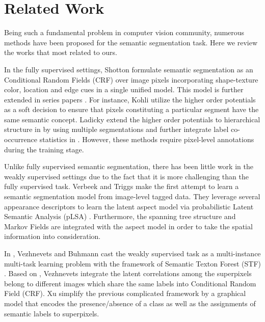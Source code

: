 \section{Related Work}
Being such a fundamental problem in computer vision community, numerous methods have been proposed for the semantic segmentation task. Here we review the works that most related to ours.

In the fully supervised settings, Shotton \etal \cite{shotton2006textonboost} formulate semantic segmentation as an Conditional Random Fields (CRF) over image pixels incorporating shape-texture color, location and edge cues in a single unified model. This model is further extended in series papers \cite{kohli2009robust,ladicky2009associative,ladicky2010graph}. For instance, Kohli \etal utilize the higher order potentials \cite{kohli2009robust} as a soft decision to ensure that pixels constituting a particular segment have the same semantic concept. Ladicky \etal extend the higher order potentials to hierarchical structure in \cite{ladicky2009associative} by using multiple segmentations and further integrate label co-occurrence statistics in \cite{ladicky2010graph}. However, these methods require pixel-level annotations during the training stage.

Unlike fully supervised semantic segmentation, there has been little work in the weakly supervised settings due to the fact that it is more challenging than the fully supervised task. Verbeek and Triggs \cite{verbeek2007region} make the first attempt to learn a semantic segmentation model from image-level tagged data. They leverage several appearance descriptors to learn the latent aspect model via probabilistic Latent Semantic Analysis (pLSA) \cite{hofmann1999probabilistic}. Furthermore, the spanning tree structure and Markov Fields are integrated with the aspect model in order to take the spatial information into consideration. 

In \cite{vezhnevets2010towards}, Vezhnevets and Buhmann cast the weakly supervised task as a multi-instance multi-task learning problem with the framework of Semantic Texton Forest (STF) \cite{shotton2008semantic}. Based on \cite{vezhnevets2010towards}, Vezhnevets \etal \cite{vezhnevets2011weakly,vezhnevets2012weakly} integrate the latent correlations among the superpixels belong to different images which share the same labels into Conditional Random Field (CRF). Xu \etal \cite{xu2014tell} simplify the previous complicated framework by a graphical model that encodes the presence/absence of a class as well as the assignments of semantic labels to superpixels.

